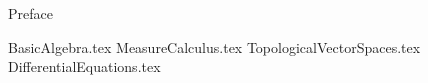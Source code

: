 \documentclass[
    oneside
]{mori-book}
\begin{document}
    \makecoverpage
    \maketitlepage

    \frontmatter
    \pagestyle{front}
    {Preface}

    \maketocpage

    \mainmatter
    \pagestyle{main}

    {BasicAlgebra.tex}
    {MeasureCalculus.tex}
    {TopologicalVectorSpaces.tex}
    {DifferentialEquations.tex}
    
    \printindex
    \printnomenclature
    
\end{document}
